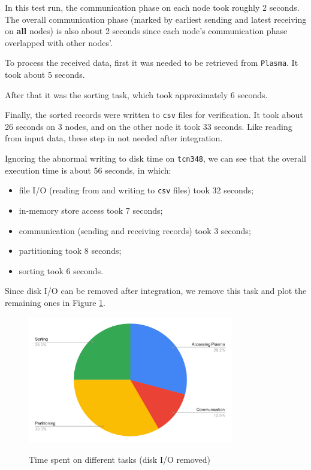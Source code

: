\documentclass{article}
\begin{document}
In this test run, the communication phase on each node took roughly 2 seconds.
The overall communication phase (marked by earliest sending and latest receiving on \textbf{all} nodes) is also about 2 seconds since each node's communication phase overlapped with other nodes'.

To process the received data, first it was needed to be retrieved from \texttt{Plasma}.
It took about 5 seconds.

After that it was the sorting task, which took approximately 6 seconds.

Finally, the sorted records were written to \texttt{csv} files for verification.
It took about 26 seconds on 3 nodes, and on the other node it took 33 seconds.
Like reading from input data, these step in not needed after integration.

Ignoring the abnormal writing to disk time on \texttt{tcn348}, we can see that the overall execution time is about 56 seconds, in which:
\begin{itemize}
    \item file I/O (reading from and writing to \texttt{csv} files) took 32 seconds;
    \item in-memory store access took 7 seconds;
    \item communication (sending and receiving records) took 3 seconds;
    \item partitioning took 8 seconds;
    \item sorting took 6 seconds.
\end{itemize}

Since disk I/O can be removed after integration, we remove this task and plot the remaining ones in Figure \ref{fig:time_of_tasks}.

\begin{figure}[h!]
    \caption{Time spent on different tasks (disk I/O removed)}
    \centering
      \includegraphics[width=0.8\textwidth]{time_of_tasks}
    \label{fig:time_of_tasks}
\end{figure}
\end{document}
